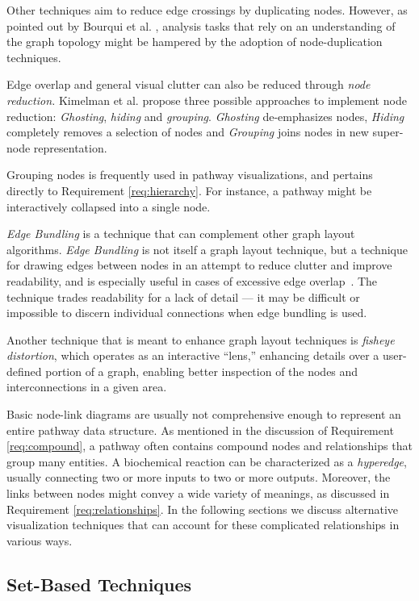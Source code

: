\documentclass[review,journal]{vgtc}         %
\newcounter{task}
\begin{document}
Other techniques aim to reduce edge crossings by duplicating nodes. However, as pointed out by Bourqui et al. \cite{bourqui2007metabolic}, analysis tasks that rely on an understanding of the graph topology might be hampered by the adoption of node-duplication techniques.

Edge overlap and general visual clutter can also be reduced through \emph{node reduction.} Kimelman et al. propose three possible approaches \cite{kimelman1995reduction} to implement node reduction: \textit{Ghosting}, \textit{hiding} and \textit{grouping}. \textit{Ghosting} de-emphasizes nodes, \textit{Hiding} completely removes a selection of nodes and \textit{Grouping} joins nodes in new super-node representation.

Grouping nodes is frequently used in pathway visualizations, and pertains directly to Requirement \ref{req:hierarchy}. For instance, a pathway might be interactively collapsed into a single node.

\emph{Edge Bundling} is a technique that can complement other graph layout algorithms. \emph{Edge Bundling} is not itself a graph layout technique, but a technique for drawing edges between nodes in an attempt to reduce clutter and improve readability, and is especially useful in cases of excessive edge overlap~\cite{holten2006hierarchical}. The technique trades readability for a lack of detail --- it may be difficult or impossible to discern individual connections when edge bundling is used.

Another technique that is meant to enhance graph layout techniques is \emph{fisheye distortion}, which operates as an interactive ``lens,'' enhancing details over a user-defined portion of a graph, enabling better inspection of the nodes and interconnections in a given area.

Basic node-link diagrams are usually not comprehensive enough to represent an entire pathway data structure. As mentioned in the discussion of Requirement \ref{req:compound}, a pathway often contains compound nodes and relationships that group many entities. A biochemical reaction can be characterized as a \emph{hyperedge}, usually connecting two or more inputs to two or more outputs. Moreover, the links between nodes might convey a wide variety of meanings, as discussed in Requirement \ref{req:relationships}. In the following sections we discuss alternative visualization techniques that can account for these complicated relationships in various ways.

\subsection{Set-Based Techniques}
\end{document}
